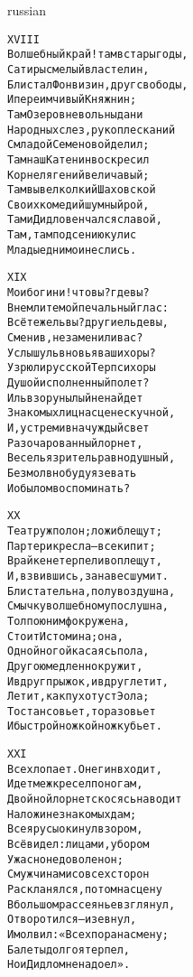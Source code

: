 \documentclass[12pt,twocolumn]{article}
\begin{document}
\begin{center}
\begin{otherlanguage*}{russian}
\begin{minipage}[t]{\dimexpr 0.5\textwidth -\tabcolsep-.5pt}
\begin{alltt}\normalfont\centering
XVIII
Волшебный край! там в стары годы,
Сатиры смелый властелин,
Блистал Фонвизин, друг свободы,
И переимчивый Княжнин;
Там Озеров невольны дани
Народных слез, рукоплесканий
С младой Семеновой делил;
Там наш Катенин воскресил
Корнеля гений величавый;
Там вывел колкий Шаховской
Своих комедий шумный рой,
Там и Дидло венчался славой,
Там, там под сению кулис
Младые дни мои неслись.
\end{alltt}
\end{minipage}
\clearpage

\begin{minipage}[t]{\dimexpr 0.5\textwidth -\tabcolsep-.5pt}
\begin{alltt}\normalfont\centering
XIX
Мои богини! что вы? где вы?
Внемлите мой печальный глас:
Всё те же ль вы? другие ль девы,
Сменив, не заменили вас?
Услышу ль вновь я ваши хоры?
Узрю ли русской Терпсихоры
Душой исполненный полет?
Иль взор унылый не найдет
Знакомых лиц на сцене скучной,
И, устремив на чуждый свет
Разочарованный лорнет,
Веселья зритель равнодушный,
Безмолвно буду я зевать
И о былом воспоминать?
\end{alltt}
\end{minipage}

\begin{minipage}[t]{\dimexpr 0.5\textwidth -\tabcolsep-.5pt}
\begin{alltt}\normalfont\centering
XX
Театр уж полон; ложи блещут;
Партер и кресла — все кипит;
В райке нетерпеливо плещут,
И, взвившись, занавес шумит.
Блистательна, полувоздушна,
Смычку волшебному послушна,
Толпою нимф окружена,
Стоит Истомина; она,
Одной ногой касаясь пола,
Другою медленно кружит,
И вдруг прыжок, и вдруг летит,
Летит, как пух от уст Эола;
То стан совьет, то разовьет
И быстрой ножкой ножку бьет.
\end{alltt}
\end{minipage}
\clearpage

\begin{minipage}[t]{\dimexpr 0.5\textwidth -\tabcolsep-.5pt}
\begin{alltt}\normalfont\centering
XXI
Все хлопает. Онегин входит,
Идет меж кресел по ногам,
Двойной лорнет скосясь наводит
На ложи незнакомых дам;
Все ярусы окинул взором,
Всё видел: лицами, убором
Ужасно недоволен он;
С мужчинами со всех сторон
Раскланялся, потом на сцену
В большом рассеянье взглянул,
Отворотился — и зевнул,
И молвил: «Всех пора на смену;
Балеты долго я терпел,
Но и Дидло мне надоел».
\end{alltt}
\end{minipage}


\end{otherlanguage*}
\end{center}
\end{document}
